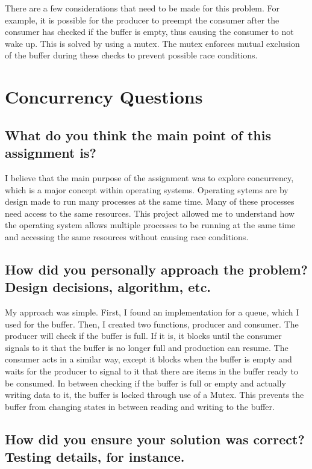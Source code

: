 \documentclass[letterpaper,draftclsnofoot,onecolumn,10pt]{article}
\begin{document}
There are a few considerations that need to be made for this problem. For example, it is possible for the producer to preempt the consumer after the consumer has checked if the buffer is empty, thus causing the consumer to not wake up. This is solved by using a mutex. The mutex enforces mutual exclusion of the buffer during these checks to prevent possible race conditions. 

\section{Concurrency Questions}

\subsection{What do you think the main point of this assignment is?}

I believe that the main purpose of the assignment was to explore concurrency, which is a major concept within operating systems. Operating sytems are by design made to run many processes at the same time. Many of these processes need access to the same resources. This project allowed me to understand how the operating system allows multiple processes to be running at the same time and accessing the same resources without causing race conditions.

\subsection{How did you personally approach the problem? Design decisions, algorithm, etc.}

My approach was simple. First, I found an implementation for a queue, which I used for the buffer. Then, I created two functions, producer and consumer. The producer will check if the buffer is full. If it is, it blocks until the consumer signals to it that the buffer is no longer full and production can resume. The consumer acts in a similar way, except it blocks when the buffer is empty and waits for the producer to signal to it that there are items in the buffer ready to be consumed. In between checking if the buffer is full or empty and actually writing data to it, the buffer is locked through use of a Mutex. This prevents the buffer from changing states in between reading and writing to the buffer.

\subsection{How did you ensure your solution was correct? Testing details, for instance.}
\end{document}
